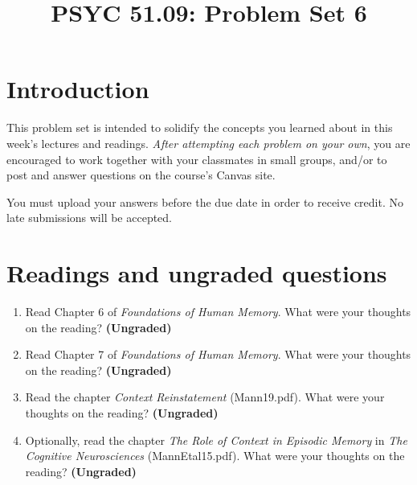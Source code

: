 \documentclass[11pt]{article}
\title{PSYC 51.09: Problem Set 6}
\date{}
\begin{document}
\maketitle
\vspace{-0.75in}
\section*{Introduction}
This problem set is intended to solidify the concepts you learned
about in this week's lectures and readings.  \textit{After attempting each problem on your own}, you are
encouraged to work together with your classmates in small groups,
and/or to post and answer questions on the course’s Canvas site.

You must upload your answers before the due date in order to receive credit.  No late submissions will be accepted.

\section*{Readings and ungraded questions}
\begin{enumerate}
\item Read Chapter 6 of \textit{Foundations of Human Memory}.  What were your thoughts on the reading?
  \textbf{(Ungraded)}

\item Read Chapter 7 of \textit{Foundations of Human Memory}.  What were your thoughts on the reading?
  \textbf{(Ungraded)}

\item Read the chapter \textit{Context Reinstatement} (Mann19.pdf).  What were your thoughts on the reading?
  \textbf{(Ungraded)}

\item Optionally, read the chapter \textit{The Role of Context in
    Episodic Memory} in \textit{The Cognitive Neurosciences}
  (MannEtal15.pdf).  What were your thoughts on the reading?
  \textbf{(Ungraded)}

\end{enumerate}
\end{document}
